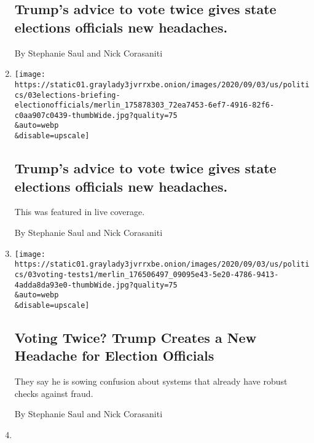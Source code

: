 \begin{enumerate}
{  \subsection{Trump's advice to vote twice gives state elections
  officials new
  headaches.}\label{trumps-advice-to-vote-twice-gives-state-elections-officials-new-headaches}}

  By Stephanie Saul and Nick Corasaniti
\item
  \href{/live/2020/09/03/us/trump-vs-biden/trumps-advice-to-vote-twice-gives-state-elections-officials-new-headaches}{}

  \texttt{[image: https://static01.graylady3jvrrxbe.onion/images/2020/09/03/us/politics/03elections-briefing-electionofficials/merlin\_175878303\_72ea7453-6ef7-4916-82f6-c0aa907c0439-thumbWide.jpg?quality=75\\\&auto=webp\\\&disable=upscale]}

  \hypertarget{trumps-advice-to-vote-twice-gives-state-elections-officials-new-headaches-1}{%
  \subsection{Trump's advice to vote twice gives state elections
  officials new
  headaches.}\label{trumps-advice-to-vote-twice-gives-state-elections-officials-new-headaches-1}}

  This was featured in live coverage.

  By Stephanie Saul and Nick Corasaniti
\item
  \href{/2020/09/03/us/politics/people-voting-twice-trump.html}{}

  \texttt{[image: https://static01.graylady3jvrrxbe.onion/images/2020/09/03/us/politics/03voting-tests1/merlin\_176506497\_09095e43-5e20-4786-9413-4adda8da93e0-thumbWide.jpg?quality=75\\\&auto=webp\\\&disable=upscale]}

  \hypertarget{voting-twice-trump-creates-a-new-headache-for-election-officials}{%
  \subsection{Voting Twice? Trump Creates a New Headache for Election
  Officials}\label{voting-twice-trump-creates-a-new-headache-for-election-officials}}

  They say he is sowing confusion about systems that already have robust
  checks against fraud.

  By Stephanie Saul and Nick Corasaniti
\item
  \href{/2020/09/03/us/elections/a-smooth-massachusetts-election-could-also-be-a-cautionary-tale.html}{}


\end{enumerate}
